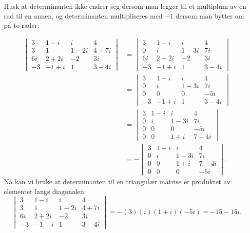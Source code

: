 \documentclass[titlepage,a4paper,12pt,norsk]{IMFeksamen}
\newcommand{\0}{\V{0}}
\begin{document}
\begin{oppgave}
Husk at determinanten ikke endrer seg dersom man legger til et multiplum av en rad til en annen, og determinanten multipliseres med $-1$ dersom man bytter om på to rader:

\begin{align*}
\begin{vmatrix}
3  &  1 - i  & i      & 4      \\
3  &  1      & 1 - 2i & 4 + 7i \\
6i &  2 + 2i & -2     & 3i     \\
-3 & -1 + i  & 1      & 3 - 4i
\end{vmatrix} &=
\begin{vmatrix}
3  &  1 - i   & i      & 4  \\
0  &  i       & 1 - 3i & 7i \\
6i &  2 + 2i  & -2     & 3i \\
-3 & -1 + i   & 1      & 3 - 4i
\end{vmatrix}\\ &=
\begin{vmatrix}
3  &  1 - i  & i      & 4  \\
0  &  i      & 1 - 3i & 7i \\
0  &  0      & 0     & -5i \\
-3 & -1 + i  & 1     & 3 - 4i
\end{vmatrix}\\ &=
\begin{vmatrix}
3 &  1 - i  & i      & 4  \\
0 &  i      & 1 - 3i & 7i \\
0 &  0      & 0      & -5i\\
0 &  0      & 1+i    & 7 - 4i
\end{vmatrix}\\ &=
-\begin{vmatrix}
3 &  1 - i  & i      & 4     \\
0 &  i      & 1 - 3i & 7i    \\
0 &  0      & 1+i    & 7 - 4i\\
0 &  0      & 0      & -5i
\end{vmatrix}.
\end{align*}
Nå kan vi bruke at determinanten til en triangulær matrise er produktet av elementet langs diagonalen:
\[
\begin{vmatrix}
3  &  1 - i  & i      & 4      \\
3  &  1      & 1 - 2i & 4 + 7i \\
6i &  2 + 2i & -2     & 3i     \\
-3 & -1 + i  & 1      & 3 - 4i
\end{vmatrix} 
=-(3)(i)(1+i)(-5i)=-15-15i.
\]

\end{oppgave}
\end{document}
